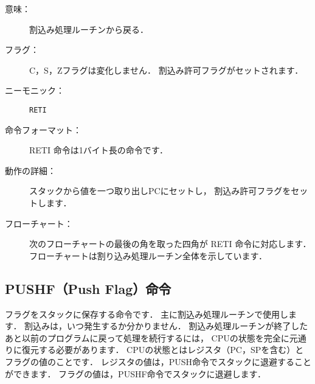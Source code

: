\begin{description}
\item[意味：]割込み処理ルーチンから戻る．

\item[フラグ：]C，S，Zフラグは変化しません．
割込み許可フラグがセットされます．

\item[ニーモニック：] {\tt RETI}

\item[命令フォーマット：]RETI 命令は1バイト長の命令です．


\item[動作の詳細：]スタックから値を一つ取り出しPCにセットし，
割込み許可フラグをセットします．

\item[フローチャート：]
次のフローチャートの最後の角を取った四角が RETI 命令に対応します．
フローチャートは割り込み処理ルーチン全体を示しています．

\begin{center}
\end{center}

\end{description}

\subsection{PUSHF（Push Flag）命令}

フラグをスタックに保存する命令です．
主に割込み処理ルーチンで使用します．
割込みは，いつ発生するか分かりません．
割込み処理ルーチンが終了したあと以前のプログラムに戻って処理を続行するには，
CPUの状態を完全に元通りに復元する必要があります．
CPUの状態とはレジスタ（PC，SPを含む）とフラグの値のことです．
レジスタの値は，PUSH命令でスタックに退避することができます．
フラグの値は，PUSHF命令でスタックに退避します．


